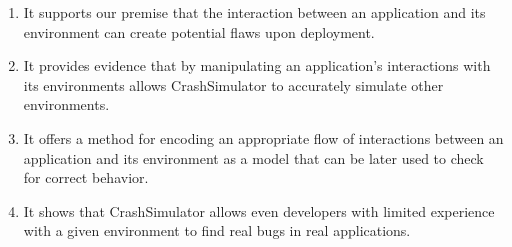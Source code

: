 \begin{enumerate}

\item{It supports our premise that the interaction between an application
and its environment can create potential flaws upon deployment.}

\item{It provides evidence that by manipulating
an application's interactions with its environments allows CrashSimulator to
accurately simulate other environments.}

\item{It offers a method for encoding an appropriate flow of
interactions between an application and its environment as a model that
can be later used to check for correct behavior.}

\item{It shows that CrashSimulator allows even developers with limited
experience with a given environment to find real bugs in
real applications.}

\end{enumerate}
